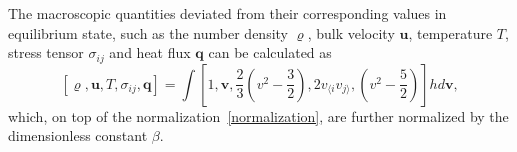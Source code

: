 %







The macroscopic quantities deviated from their corresponding values in equilibrium state, such as the number density $\varrho$, bulk velocity $\bm{u}$, temperature $T$, stress tensor $\sigma_{ij}$ and heat flux $\bm{q}$ can be calculated as
\begin{equation}\label{MP}
[\varrho,\bm{u},T,\sigma_{ij},\bm{q}]=
\int\left[1,\bm{v},\frac{2}{3}\left(v^2-\frac{3}{2}\right),2v_{\langle i}v_{j\rangle},\left({v^2}-\frac{5}{2}\right)\right]{h}d\bm{v},
\end{equation}
which, on top of the normalization~\eqref{normalization}, are further normalized by the dimensionless constant $\beta$.


